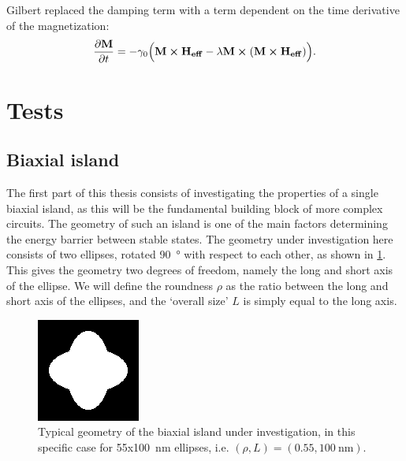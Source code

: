 \documentclass[10pt,a4paper]{article}
\begin{document}
Gilbert \cite{Gilbert1956} replaced the damping term with a term dependent on the time derivative of the magnetization:
\begin{equation}
	\frac{\partial \vb{M}}{\partial t} = - \gamma_0 \Big( \vb{M} \cross \vb{H_{eff}} - \lambda \vb{M} \cross (\vb{M} \cross \vb{H_{eff}}) \Big) \mathrm{.}
\end{equation}



\section{Tests}
\subsection{Biaxial island}
The first part of this thesis consists of investigating the properties of a single biaxial island, as this will be the fundamental building block of more complex circuits. The geometry of such an island is one of the main factors determining the energy barrier between stable states. The geometry under investigation here consists of two ellipses, rotated \SI{90}{\degree} with respect to each other, as shown in \cref{fig:biaxial_island:geometryTypical}. This gives the geometry two degrees of freedom, namely the long and short axis of the ellipse. We will define the roundness $\rho$ as the ratio between the long and short axis of the ellipses, and the `overall size' $L$ is simply equal to the long axis.
\begin{figure}
    \centering
    \includegraphics[width=0.3\columnwidth]{Figures/biaxial_island/Geometry/geomPlus55.png}
    \caption{Typical geometry of the biaxial island under investigation, in this specific case for 55x\SI{100}{\nano\metre} ellipses, i.e. $(\rho, L)=(0.55, \SI{100}{\nano\metre})$.}
    \label{fig:biaxial_island:geometryTypical}
\end{figure}
\end{document}
